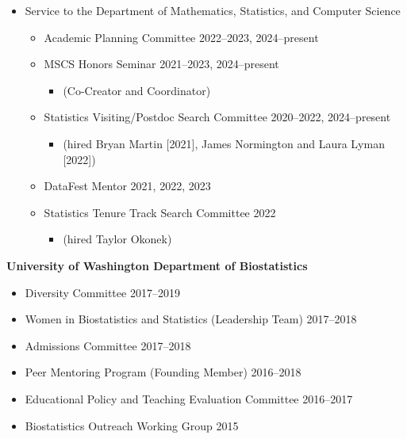 \documentclass[margin]{res}
\begin{document}
\begin{resume}
\begin{itemize}
	\item Service to the Department of Mathematics, Statistics, and Computer Science
		\begin{itemize}
		\item Academic Planning Committee \hfill 2022--2023, 2024--present
		\item MSCS Honors Seminar  \hfill 2021--2023, 2024--present %
			\begin{itemize}[leftmargin=-0in] \vspace{-0.2cm} 
			\item[]  \begin{footnotesize}(Co-Creator and Coordinator) \end{footnotesize}
			\end{itemize} \vspace{-0.1cm}
		\item Statistics Visiting/Postdoc Search Committee \hfill 2020--2022, 2024--present
			\begin{itemize}[leftmargin=-0in] \vspace{-0.2cm} 
			\item[]  \begin{footnotesize}(hired Bryan Martin [2021], James Normington and Laura Lyman [2022]) \end{footnotesize}
			\end{itemize} 
		\item DataFest Mentor  \hfill 2021, 2022, 2023
		\item Statistics Tenure Track Search Committee \hfill 2022 
			\begin{itemize}[leftmargin=-0in] \vspace{-0.2cm}
			\item[] \begin{footnotesize}(hired Taylor Okonek)\end{footnotesize} 
			\end{itemize} 
		\end{itemize}
	\end{itemize}


\textbf{University of Washington Department of Biostatistics}
\begin{itemize} %
	\item Diversity Committee \hfill 2017--2019
	\item Women in Biostatistics and Statistics (Leadership Team) \hfill 2017--2018
	\item Admissions Committee \hfill 2017--2018
	\item Peer Mentoring Program (Founding Member) \hfill 2016--2018
	\item Educational Policy and Teaching Evaluation Committee \hfill 2016--2017
	\item Biostatistics Outreach Working Group \hfill 2015%
\end{itemize}


\end{resume}
\end{document}
